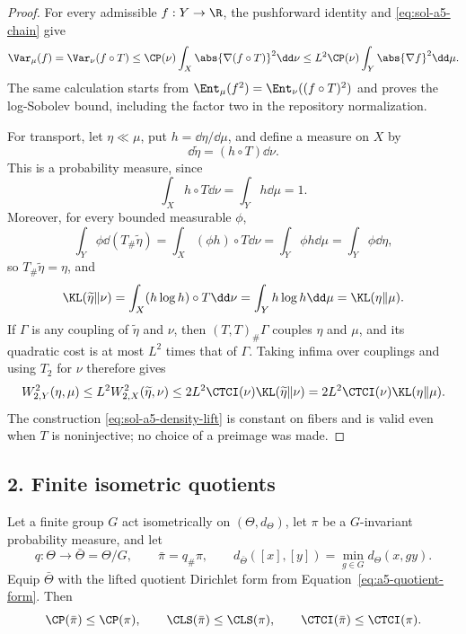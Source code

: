 \documentclass[../main.tex]{subfiles}
\begin{document}
\begin{proof}
For every admissible \(f:Y\to\R\), the pushforward identity and
\eqref{eq:sol-a5-chain} give
\[
 \Var_\mu(f)=\Var_\nu(f\circ T)
 \le \CP(\nu)\int_X\abs{\nabla(f\circ T)}^2\dd\nu
 \le L^2\CP(\nu)\int_Y\abs{\nabla f}^2\dd\mu.
\]
The same calculation starts from
\(\Ent_\mu(f^2)=\Ent_\nu((f\circ T)^2)\) and proves the log-Sobolev bound, including the
factor two in the repository normalization.

For transport, let \(\eta\ll\mu\), put \(h=\dd\eta/\dd\mu\), and define a measure on \(X\) by
\begin{equation}\label{eq:sol-a5-density-lift}
 \dd\widetilde\eta=(h\circ T)\dd\nu.
\end{equation}
This is a probability measure, since
\[
 \int_Xh\circ T\dd\nu=\int_Yh\dd\mu=1.
\]
Moreover, for every bounded measurable \(\phi\),
\[
 \int_Y\phi\dd(T_\#\widetilde\eta)
 =\int_X(\phi h)\circ T\dd\nu
 =\int_Y\phi h\dd\mu=\int_Y\phi\dd\eta,
\]
so \(T_\#\widetilde\eta=\eta\), and
\begin{equation}\label{eq:sol-a5-entropy-lift}
 \KL(\widetilde\eta\|\nu)
 =\int_X(h\log h)\circ T\dd\nu
 =\int_Yh\log h\dd\mu
 =\KL(\eta\|\mu).
\end{equation}
If \(\Gamma\) is any coupling of \(\widetilde\eta\) and \(\nu\), then
\((T,T)_\#\Gamma\) couples \(\eta\) and \(\mu\), and its quadratic cost is at most
\(L^2\) times that of \(\Gamma\).  Taking infima over couplings and using \(T_2\) for \(\nu\)
therefore gives
\[
 W_{2,Y}^2(\eta,\mu)
 \le L^2W_{2,X}^2(\widetilde\eta,\nu)
 \le 2L^2\CTCI(\nu)\KL(\widetilde\eta\|\nu)
 =2L^2\CTCI(\nu)\KL(\eta\|\mu).
\]
The construction \eqref{eq:sol-a5-density-lift} is constant on fibers and is valid even when
\(T\) is noninjective; no choice of a preimage was made.
\end{proof}

\subsection*{2. Finite isometric quotients}

\begin{theorem}
\label{thm:sol-a5-monotone}
Let a finite group \(G\) act isometrically on \((\Theta,d_\Theta)\), let \(\pi\) be a
\(G\)-invariant probability measure, and let
\[
 q:\Theta\to\bar\Theta=\Theta/G,
 \qquad \bar\pi=q_\#\pi,
 \qquad
 d_{\bar\Theta}([x],[y])=\min_{g\in G}d_\Theta(x,gy).
\]
Equip \(\bar\Theta\) with the lifted quotient Dirichlet form from
Equation~\ref{eq:a5-quotient-form}.  Then
\[
 \CP(\bar\pi)\le\CP(\pi),\qquad
 \CLS(\bar\pi)\le\CLS(\pi),\qquad
 \CTCI(\bar\pi)\le\CTCI(\pi).
\]
\end{theorem}
\end{document}
